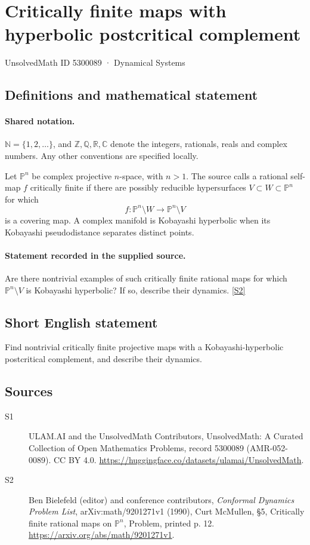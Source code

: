 \documentclass[11pt]{article}
\newcommand{\sref}[2]{\hyperlink{source:#1:#2}{[S#2]}}
\begin{document}
\setcounter{section}{5300088}
\section{Critically finite maps with hyperbolic postcritical complement}\label{5300089}
{\small\sffamily UnsolvedMath ID 5300089 · Dynamical Systems}
\subsection{Definitions and mathematical statement}

\paragraph{Shared notation.}$\mathbb N=\{1,2,\ldots\}$, and $\mathbb Z,\mathbb Q,\mathbb R,\mathbb C$ denote the integers, rationals, reals and complex numbers. Any other conventions are specified locally.


Let $\mathbb P^n$ be complex projective $n$-space, with $n>1$. The source calls a rational self-map $f$ critically finite if there are possibly reducible hypersurfaces $V\subset W\subset\mathbb P^n$ for which
\[f:\mathbb P^n\setminus W\longrightarrow\mathbb P^n\setminus V\]
is a covering map. A complex manifold is Kobayashi hyperbolic when its Kobayashi pseudodistance separates distinct points.
\paragraph{Statement recorded in the supplied source.}
Are there nontrivial examples of such critically finite rational maps for which $\mathbb P^n\setminus V$ is Kobayashi hyperbolic? If so, describe their dynamics. \sref{5300089}{2}
\subsection{Short English statement}
Find nontrivial critically finite projective maps with a Kobayashi-hyperbolic postcritical complement, and describe their dynamics.
\subsection{Sources}
\begin{description}
\item[\hypertarget{source:5300089:1}{S1}] ULAM.AI and the UnsolvedMath Contributors, UnsolvedMath: A Curated Collection of Open Mathematics Problems, record 5300089 (AMR-052-0089). CC BY 4.0. \url{https://huggingface.co/datasets/ulamai/UnsolvedMath}.
\item[\hypertarget{source:5300089:2}{S2}] Ben Bielefeld (editor) and conference contributors, \emph{Conformal Dynamics Problem List}, arXiv:math/9201271v1 (1990), Curt McMullen, \S5, Critically finite rational maps on $\mathbb P^n$, Problem, printed p. 12. \url{https://arxiv.org/abs/math/9201271v1}.
\end{description}
\label{end:5300089}
\end{document}
